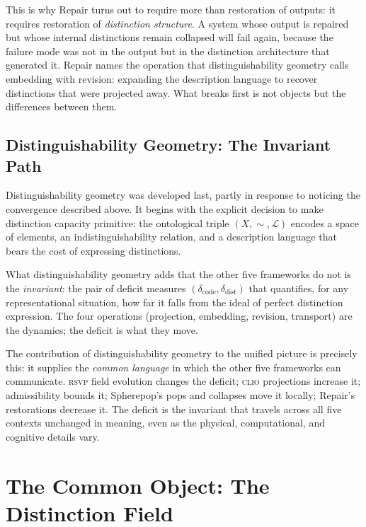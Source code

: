 \documentclass[12pt, letterpaper]{article}
\theoremstyle{remark}
\newcommand{\rsvp}{\textsc{rsvp}}
\newcommand{\clio}{\textsc{clio}}
\newcommand{\Dc}{\delta_{\mathrm{code}}}
\newcommand{\Dd}{\delta_{\mathrm{dist}}}
\begin{document}
This is why Repair turns out to require more than restoration of outputs:
it requires restoration of \emph{distinction structure}.  A system whose
output is repaired but whose internal distinctions remain collapsed will
fail again, because the failure mode was not in the output but in the
distinction architecture that generated it.  Repair names the operation
that distinguishability geometry calls embedding with revision: expanding
the description language to recover distinctions that were projected away.
What breaks first is not objects but the differences between them.

\subsection{Distinguishability Geometry: The Invariant Path}

Distinguishability geometry was developed last, partly in response to
noticing the convergence described above.  It begins with the explicit
decision to make distinction capacity primitive: the ontological triple
$(X, {\sim}, \mathcal{L})$ encodes a space of elements, an
indistinguishability relation, and a description language that bears the
cost of expressing distinctions.

What distinguishability geometry adds that the other five frameworks do not
is the \emph{invariant}: the pair of deficit measures $(\Dc, \Dd)$ that
quantifies, for any representational situation, how far it falls from the
ideal of perfect distinction expression.  The four operations (projection,
embedding, revision, transport) are the dynamics; the deficit is what they
move.

The contribution of distinguishability geometry to the unified picture is
precisely this: it supplies the \emph{common language} in which the other
five frameworks can communicate.  \rsvp{} field evolution changes the
deficit; \clio{} projections increase it; admissibility bounds it;
Spherepop's pops and collapses move it locally; Repair's restorations
decrease it.  The deficit is the invariant that travels across all five
contexts unchanged in meaning, even as the physical, computational, and
cognitive details vary.

\section{The Common Object: The Distinction Field}
\end{document}
